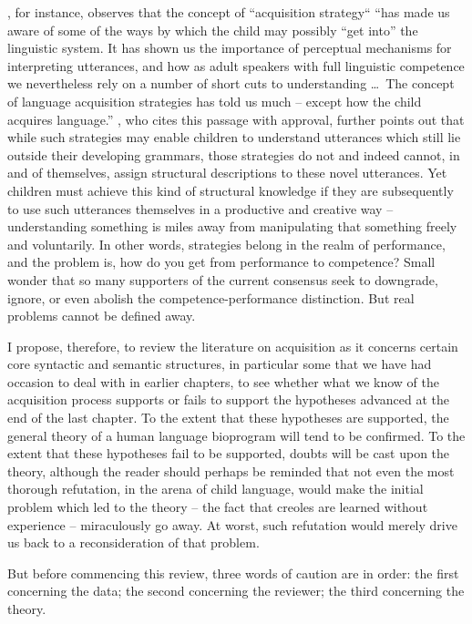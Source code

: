 \citet[353]{Cromer1976}, for instance, observes that the concept of
``acquisition strategy`` ``has made us aware of some of the ways by which the child may possibly ``get into'' the linguistic system. It has shown us the importance of perceptual mechanisms for interpreting utterances, and how as adult speakers with full linguistic competence we nevertheless rely on a number of short cuts to understanding \ldots~The concept of language acquisition strategies has told us much -- except how the child acquires language.'' \citet{Bowerman1979}, who cites this passage with approval, further points out that while such strategies may enable children to understand utterances which still lie outside their developing grammars, those strategies do not and indeed cannot, in and of themselves, assign structural descriptions to these novel utterances. Yet children must achieve this kind of structural knowledge if they are subsequently to use such utterances themselves in a productive and creative way -- understanding something is miles away from manipulating that something freely and voluntarily. In other words, strategies belong in the realm of performance, and the problem is, how do you get from performance to competence? Small wonder that so many supporters of the current consensus seek to downgrade, ignore, or even abolish the competence-performance distinction. But real problems cannot be defined away.

I propose, therefore, to review the literature on acquisition as it concerns certain core syntactic and semantic structures, in particular some that we have had occasion to deal with in earlier chapters, to see whether what we know of the acquisition process supports or fails to support the hypotheses advanced at the end of the last chapter. To the extent that these hypotheses are supported, the general theory of a human language bioprogram will tend to be confirmed. To the extent that these hypotheses fail to be supported, doubts will be cast upon the theory, although the reader should perhaps be reminded that not even the most thorough refutation, in the arena of child language, would make the initial problem which led to the theory -- the fact that creoles are learned without experience -- miraculously go away. At worst, such refutation would merely drive us back to a reconsideration of that problem.

But before commencing this review, three words of caution are in order: the first concerning the data; the second concerning the reviewer; the third concerning the theory.

